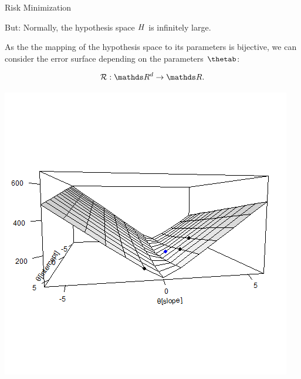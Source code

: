 \documentclass[11pt,compress,t,notes=noshow, xcolor=table]{beamer}
\begin{document}
\begin{vbframe}{Risk Minimization}

But: Normally, the hypothesis space $H$ is infinitely large. 

\lz

As the the mapping of the hypothesis space to its parameters is bijective, we can consider the error surface depending on the parameters $\thetab$:

\begin{table}
\begin{minipage}{0.4\linewidth}
$$\risk : \R^d \to \R.$$
\end{minipage}\hfill
	\begin{minipage}{0.55\linewidth}
\includegraphics[width=\textwidth]{figure/ml-basic-riskmin-error-surface.png}
\end{minipage}
\end{table}

\end{vbframe}
\end{document}
